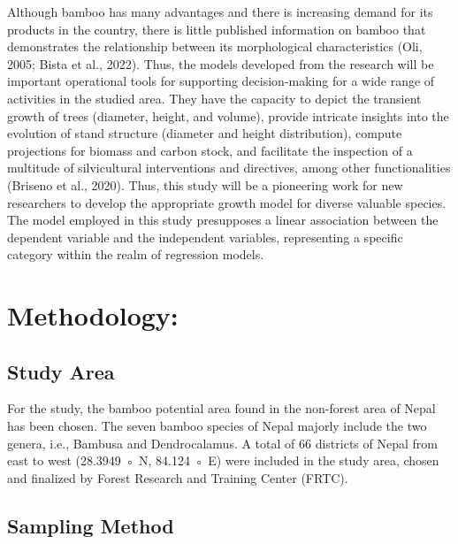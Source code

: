 \documentclass[preprint, 3p,
authoryear]{elsarticle} %
\begin{document}
Although bamboo has many advantages and there is increasing demand for
its products in the country, there is little published information on
bamboo that demonstrates the relationship between its morphological
characteristics (Oli, 2005; Bista et al., 2022). Thus, the models
developed from the research will be important operational tools for
supporting decision-making for a wide range of activities in the studied
area. They have the capacity to depict the transient growth of trees
(diameter, height, and volume), provide intricate insights into the
evolution of stand structure (diameter and height distribution), compute
projections for biomass and carbon stock, and facilitate the inspection
of a multitude of silvicultural interventions and directives, among
other functionalities (Briseno et al., 2020). Thus, this study will be a
pioneering work for new researchers to develop the appropriate growth
model for diverse valuable species. The model employed in this study
presupposes a linear association between the dependent variable and the
independent variables, representing a specific category within the realm
of regression models.

\hypertarget{methodology}{%
\section{Methodology:}\label{methodology}}

\hypertarget{study-area}{%
\subsection{Study Area}\label{study-area}}

For the study, the bamboo potential area found in the non-forest area of
Nepal has been chosen. The seven bamboo species of Nepal majorly include
the two genera, i.e., Bambusa and Dendrocalamus. A total of 66 districts
of Nepal from east to west (28.3949 ◦ N, 84.124 ◦ E) were included in
the study area, chosen and finalized by Forest Research and Training
Center (FRTC).

\hypertarget{sampling-method}{%
\subsection{Sampling Method}\label{sampling-method}}
\end{document}
